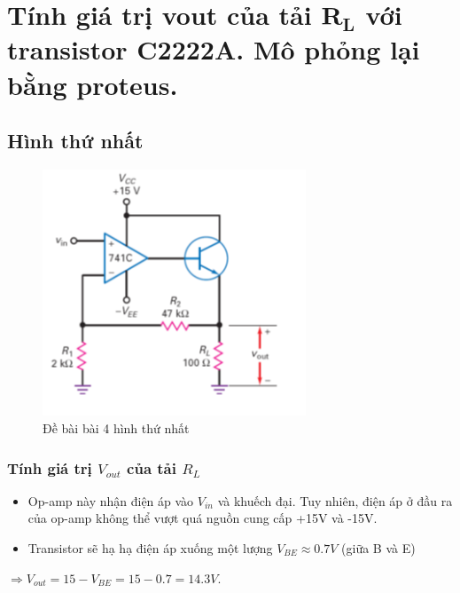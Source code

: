 \section{Tính giá trị vout của tải $\mathbf{R_L}$ với transistor C2222A. Mô phỏng lại bằng proteus.}
    \subsection{Hình thứ nhất}
        \begin{figure}[H]
            \centering
            \includegraphics[width=0.7\textwidth]{pictures/topic4_a.png}
            \caption{Đề bài bài 4 hình thứ nhất}
        \end{figure}
        \subsubsection{Tính giá trị $V_{out}$ của tải $R_L$}
            \begin{itemize}
                \item Op-amp này nhận điện áp vào $V_{in}$ và khuếch đại. Tuy nhiên, điện áp ở đầu ra của op-amp không thể vượt quá nguồn cung cấp +15V và -15V.
                \item Transistor sẽ hạ hạ điện áp xuống một lượng $V_{BE} \approx 0.7V$ (giữa B và E) 
            \end{itemize}
            $\Rightarrow V_{out} = 15 - V_{BE} = 15 - 0.7 = 14.3V$.
